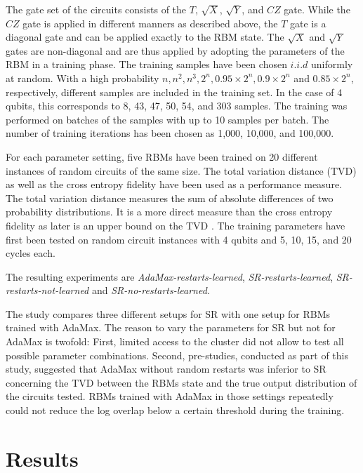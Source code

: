 The gate set of the circuits consists of the $T$, $\sqrt{X}$, $\sqrt{Y}$, and $CZ$ gate. While the $CZ$ gate is 
applied in different manners as described above, the $T$ gate is a diagonal gate and can be applied exactly to the RBM state.
The $\sqrt{X}$ and $\sqrt{Y}$ gates are non-diagonal and are thus applied by adopting the parameters of the RBM in 
a training phase. The training samples have been chosen $i.i.d$ uniformly at random. 
With a high probability $n, n^2, n^3, 2^n, 0.95 \times 2^n, 0.9 \times 2^n$ and $0.85 \times 2^n$,
respectively, different samples are included in the training set. In the case of 4 qubits, this corresponds to 
8, 43, 47, 50, 54, and 303 samples. The training was performed on batches of the samples with 
up to 10 samples per batch.
The number of training iterations has been chosen as 1,000, 10,000, and 100,000. 

For each parameter setting, five RBMs have been trained on 20 different instances of random circuits of the same 
size. The total variation distance (TVD) as well as the cross entropy fidelity have been used as a performance measure.
The total variation distance measures the sum of absolute differences of two probability distributions. 
It is a more direct measure than the cross entropy fidelity as later is an upper bound on the TVD \cite{bouland2018quantum}.
The training parameters have first been tested on random circuit instances with 4 qubits and 
5, 10, 15, and 20 cycles each. 

The resulting experiments are \textit{AdaMax-restarts-learned}, \textit{SR-restarts-learned}, 
\textit{SR-restarts-not-learned} and \textit{SR-no-restarts-learned}. 

The study compares three different setups for SR with one setup for RBMs trained with 
AdaMax. The reason to vary the parameters for SR but not for AdaMax is twofold:
First, limited access to the cluster did not allow to test all possible parameter combinations. Second,
pre-studies, conducted as part of this study, suggested that AdaMax without random restarts 
was inferior to SR concerning the TVD between the RBMs state and the true output distribution of the 
circuits tested. RBMs trained with AdaMax in those settings repeatedly could not reduce the 
log overlap below a certain threshold during the training.

\section{Results}
\label{sec:results}

